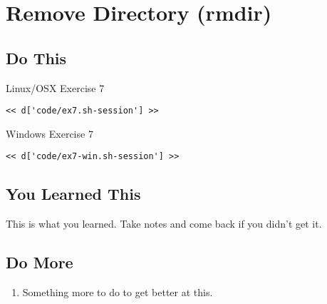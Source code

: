 \chapter{Remove Directory (rmdir)}

\section{Do This}

\begin{code}{Linux/OSX Exercise 7}
\begin{Verbatim}
<< d['code/ex7.sh-session'] >>
\end{Verbatim}
\end{code}

\begin{code}{Windows Exercise 7}
\begin{Verbatim}
<< d['code/ex7-win.sh-session'] >>
\end{Verbatim}
\end{code}

\section{You Learned This}

This is what you learned.  Take notes and come back if you didn't get it.

\section{Do More}

\begin{enumerate}
\item Something more to do to get better at this.
\end{enumerate}

